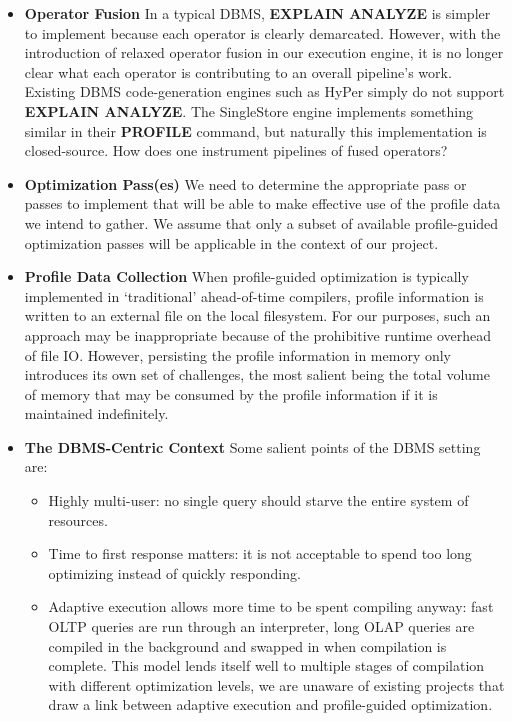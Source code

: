 \documentclass{vldb}
\newcommand{\dbCode}[1]{{\sffamily\small \textbf{#1}}\xspace}
\begin{document}
\begin{itemize}
    \item \textbf{Operator Fusion} In a typical DBMS, \dbCode{EXPLAIN ANALYZE} is simpler to implement because each operator is clearly demarcated. However, with the introduction of relaxed operator fusion in our execution engine, it is no longer clear what each operator is contributing to an overall pipeline's work. Existing DBMS code-generation engines such as HyPer simply do not support \dbCode{EXPLAIN ANALYZE}. The SingleStore engine implements something similar in their \dbCode{PROFILE} command, but naturally this implementation is closed-source. How does one instrument pipelines of fused operators?
    \item \textbf{Optimization Pass(es)} We need to determine the appropriate pass or passes to implement that will be able to make effective use of the profile data we intend to gather. We assume that only a subset of available profile-guided optimization passes will be applicable in the context of our project.
    \item \textbf{Profile Data Collection} When profile-guided optimization is typically implemented in `traditional' ahead-of-time compilers, profile information is written to an external file on the local filesystem. For our purposes, such an approach may be inappropriate because of the prohibitive runtime overhead of file IO. However, persisting the profile information in memory only introduces its own set of challenges, the most salient being the total volume of memory that may be consumed by the profile information if it is maintained indefinitely.
    \item \textbf{The DBMS-Centric Context} Some salient points of the DBMS setting are:
    \begin{itemize}
        \item Highly multi-user: no single query should starve the entire system of resources.
        \item Time to first response matters: it is not acceptable to spend too long optimizing instead of quickly responding.
        \item Adaptive execution allows more time to be spent compiling anyway: fast OLTP queries are run through an interpreter, long OLAP queries are compiled in the background and swapped in when compilation is complete. This model lends itself well to multiple stages of compilation with different optimization levels, we are unaware of existing projects that draw a link between adaptive execution and profile-guided optimization.
    \end{itemize}
\end{itemize}
\end{document}
